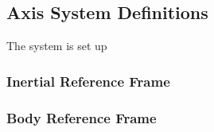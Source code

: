 \subsection{Axis System Definitions}

The system is set up

\subsubsection{Inertial Reference Frame}



\subsubsection{Body Reference Frame}
